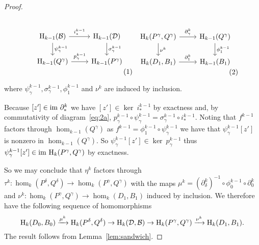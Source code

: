 \begin{proof}
  \begin{small}\begin{subequations}\label{eq:main2}
  \begin{minipage}{0.43\textwidth}\begin{equation}\label{eq:main2a}\begin{tikzcd}%
    \hom_{k-1}(\B)\arrow{r}{i_*^{k-1}}\arrow{d}{\psi_\gamma^{k-1}} &
    \hom_{k-1}(\D)\arrow{d}{\sigma_\gamma^{k-1}}\\
    \hom_{k-1}(Q^\gamma)\arrow{r}{p_\gamma^{k-1}} &
    \hom_{k-1}(P^\gamma)
  \end{tikzcd}\end{equation}\end{minipage}
  \begin{minipage}{0.43\textwidth}\begin{equation}\label{eq:main2b}\begin{tikzcd}%
    \hom_{k}(P^\gamma, Q^\gamma)\arrow{r}{\partial_\gamma^k}\arrow{d}{\nu^k} &
    \hom_{k-1}(Q^\gamma)\arrow{d}{\phi_1^{k-1}}\\
    \hom_{k}(D_1, B_1)\arrow{r}{\partial_1^k} &
    \hom_{k-1}(B_1)
  \end{tikzcd}\end{equation}\end{minipage}
  \end{subequations}\end{small}\vspace{2ex}

  \noindent where $\psi_\gamma^{k-1}, \sigma_\gamma^{k-1}, \phi_1^{k-1}$ and $\nu^k$ are induced by inclusion.

  Because $[z']\in\mathrm{im}~\partial_*^k$ we have $[z']\in\ker~i_*^{k-1}$ by exactness and, by commutativity of diagram~\ref{eq:2a}, $p_\gamma^{k-1}\circ \psi_\gamma^{k-1} = \sigma_\gamma^{k-1}\circ i_*^{k-1}$.
  Noting that $f^{k-1}$ factors through $\hom_{k-1}(Q^\gamma)$ as $f^{k-1} = \phi_1^{k-1}\circ\psi_\gamma^{k-1}$ we have that $\psi_\gamma^{k-1}[z']$ is nonzero in $\hom_{k-1}(Q^\gamma)$.
  So $\psi_\gamma^{k-1}[z']\in\ker~p_\gamma^{k-1}$ thus $\psi_\gamma^{k-1}[z'] \in\mathrm{im}~\mathrm{H}_k(P^\gamma, Q^\gamma)$ by exactness.

  So we may conclude that $\eta^k$ factors through $\tau^k : \hom_k(P^\delta, Q^\delta)\to \hom_k(P^\gamma, Q^\gamma)$ with the maps $\mu^k = (\partial^k_\delta)^{-1}\circ \phi_0^{k-1}\circ\partial_0^k$ and $\nu^k : \hom_k(P^\gamma, Q^\gamma) \to \hom_k(D_1, B_1)$ induced by inclusion.
  We therefore have the following sequence of homomorphisms
  \[ \mathrm{H}_k(D_0, B_0)\xrightarrow{\mu^k} \mathrm{H}_k(P^\delta, Q^\delta)\to\mathrm{H}_k({\mathcal{D}}, {\mathcal{B}})\to\mathrm{H}_k(P^\gamma, Q^\gamma)\xrightarrow{\nu^k} \mathrm{H}_k(D_1, B_1).\]
  The result follows from Lemma~\ref{lem:sandwich}.
\end{proof}
